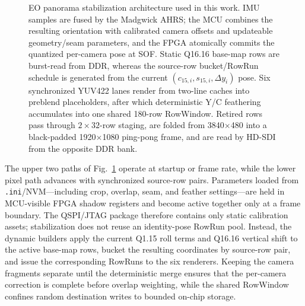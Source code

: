 \documentclass[journal]{IEEEtran}
\begin{document}
\begin{figure}[!t]
{}
\caption{EO panorama stabilization architecture used in this work. IMU samples are fused by the Madgwick AHRS; the MCU combines the resulting orientation with calibrated camera offsets and updateable geometry/seam parameters, and the FPGA atomically commits the quantized per-camera pose at SOF. Static Q16.16 base-map rows are burst-read from DDR, whereas the source-row bucket/RowRun schedule is generated from the current $(c_{15,i},s_{15,i},\Delta y_i)$ pose. Six synchronized YUV422 lanes render from two-line caches into preblend placeholders, after which deterministic Y/C feathering accumulates into one shared 180-row RowWindow. Retired rows pass through $2{\times}32$-row staging, are folded from 3840$\times$480 into a black-padded 1920$\times$1080 ping-pong frame, and are read by HD-SDI from the opposite DDR bank.}
\label{fig:pipeline}
\end{figure}

The upper two paths of Fig.~\ref{fig:pipeline} operate at startup or frame rate, while the lower pixel path advances with synchronized source-row pairs. Parameters loaded from \texttt{.ini}/NVM---including crop, overlap, seam, and feather settings---are held in MCU-visible FPGA shadow registers and become active together only at a frame boundary. The QSPI/JTAG package therefore contains only static calibration assets; stabilization does not reuse an identity-pose RowRun pool. Instead, the dynamic builders apply the current Q1.15 roll terms and Q16.16 vertical shift to the active base-map rows, bucket the resulting coordinates by source-row pair, and issue the corresponding RowRuns to the six renderers. Keeping the camera fragments separate until the deterministic merge ensures that the per-camera correction is complete before overlap weighting, while the shared RowWindow confines random destination writes to bounded on-chip storage.
\end{document}
